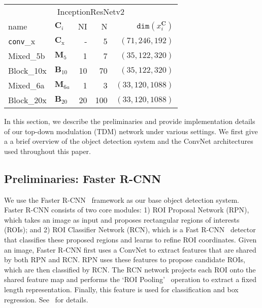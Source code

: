 \documentclass[10pt,twocolumn,letterpaper]{article}
\newcommand{\vv}[1]{{\texttt{#1}}}
\newcommand{\conv}{\vv{conv}}
\begin{document}
\begin{table*}
\begin{tabular}{@{}llrrr@{}}
    \toprule
    \multicolumn{5}{c}{InceptionResNetv2}\\
    \arrayrulecolor{gray}
    \midrule
    \arrayrulecolor{black}
    name & $\mathbf{C}_i$ & NI & N & $\texttt{dim}\left(x^\mathbf{C}_i\right)$\\
    \midrule
    \conv\_x & $\mathbf{C}_\text{x}$ & -  & 5   & $\left(71,246,192\right)$\\
    Mixed\_5b & $\mathbf{M}_5$ & 1  & 7   & $\left(35,122,320\right)$\\
    Block\_10x & $\mathbf{B}_{10}$ & 10  & 70   & $\left(35,122,320\right)$\\
    Mixed\_6a & $\mathbf{M}_{6a}$ & 1  & 3   & $\left(33,120,1088\right)$\\
    Block\_20x & $\mathbf{B}_{20}$ & 20 & 100 & $\left(33,120,1088\right)$\\
    \bottomrule
    \end{tabular}
    \vspace{-0.07in}
\end{table*}

In this section, we describe the preliminaries and provide implementation details of our top-down modulation (TDM) network under various settings. We first give a a brief overview of the object detection system and the ConvNet architectures used throughout this paper.

\subsection{Preliminaries: Faster R-CNN}\label{sec:frrcn}
We use the Faster R-CNN~\cite{ren2015faster} framework as our base object detection system.
Faster R-CNN consists of two core modules: 1) ROI Proposal Network (RPN), which takes an image as input and proposes rectangular regions of interests (ROIs); and 2) ROI Classifier Network (RCN), which is a Fast R-CNN~\cite{girshick2015fast} detector that classifies these proposed regions and learns to refine ROI coordinates. Given an image, Faster R-CNN first uses a ConvNet to extract features that are shared by both RPN and RCN. RPN uses these features to propose candidate ROIs, which are then classified by RCN. The RCN network projects each ROI onto the shared feature map and performs the `ROI Pooling'~\cite{girshick2015fast,he2014spatial} operation to extract a fixed length representation.
Finally, this feature is used for classification and box regression. See~\cite{girshick2015fast,he2014spatial,ren2015faster,huang2016speed} for details.
\end{document}
